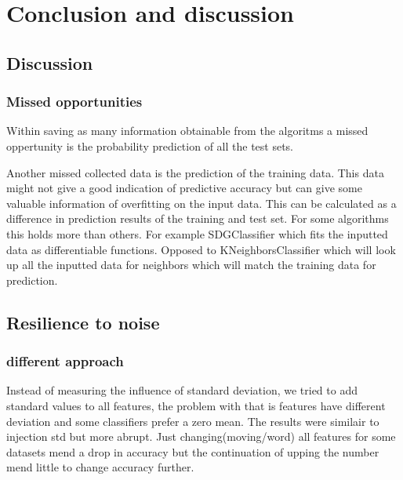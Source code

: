 \documentclass[a4paper,10pt]{article}
\begin{document}






\newpage
\section{Conclusion and discussion} \label{Chapter5}

\subsection{Discussion}

\subsubsection{Missed opportunities}
Within saving as many information obtainable from the algoritms a missed oppertunity is the probability prediction of all the test sets. 

Another missed collected data is the prediction of the training data. This data might not give a good indication of predictive accuracy but can give some valuable information of overfitting on the input data. This can be calculated as a difference in prediction results of the training and test set. For some algorithms this holds more than others. For example SDGClassifier which fits the inputted data as differentiable functions. Opposed to KNeighborsClassifier which will look up all the inputted data for neighbors which will match the training data for prediction. 

\subsection{Resilience to noise}






\subsubsection{different approach}
Instead of measuring the influence of standard deviation, we tried to add standard values to all features, the problem with that is features have different deviation and some classifiers prefer a zero mean. The results were similair to injection std but more abrupt. Just changing(moving/word) all features for some datasets mend a drop in accuracy but the continuation of upping the number mend little to change accuracy further.
\end{document}
